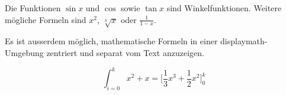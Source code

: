 \documentclass{article}
\begin{document}
  Die Funktionen
  $ \sin x$
  und
  \( \cos \)
  sowie
  \begin{math} \tan x \end{math}
  sind Winkelfunktionen. Weitere mögliche Formeln sind $ x^2 $, $ \sqrt[3]{x} $ oder $ \frac{1}{1-x} $.

  Es ist ausserdem möglich, mathematische Formeln in einer displaymath-Umgebung zentriert und separat vom Text anzuzeigen.

  \begin{displaymath}
    \int_{i=0}^k
      x^2 + x =
      \bigl[
        \frac{1}{3} x^3 + \frac{1}{2} x^2
      \bigr]_0^k
  \end{displaymath}
\end{document}
